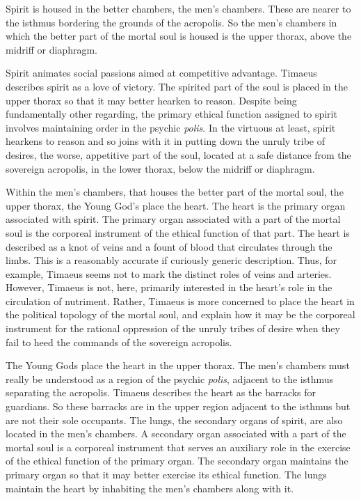 Spirit is housed in the better chambers, the men's chambers. These are nearer to the isthmus bordering the grounds of the acropolis. So the men's chambers in which the better part of the mortal soul is housed is the upper thorax, above the midriff or diaphragm.

Spirit animates social passions aimed at competitive advantage. Timaeus describes spirit as a love of victory. The spirited part of the soul is placed in the upper thorax so that it may better hearken to reason. Despite being fundamentally other regarding, the primary ethical function assigned to spirit involves maintaining order in the psychic \emph{polis}. In the virtuous at least, spirit hearkens to reason and so joins with it in putting down the unruly tribe of desires, the worse, appetitive part of the soul, located at a safe distance from the sovereign acropolis, in the lower thorax, below the midriff or diaphragm.

Within the men's chambers, that houses the better part of the mortal soul, the upper thorax, the Young God's place the heart. The heart is the primary organ associated with spirit. The primary organ associated with a part of the mortal soul is the corporeal instrument of the ethical function of that part. The heart is described as a knot of veins and a fount of blood that circulates through the limbs. This is a reasonably accurate if curiously generic description. Thus, for example, Timaeus seems not to mark the distinct roles of veins and arteries. However, Timaeus is not, here, primarily interested in the heart's role in the circulation of nutriment. Rather, Timaeus is more concerned to place the heart in the political topology of the mortal soul, and explain how it may be the corporeal instrument for the rational oppression of the unruly tribes of desire when they fail to heed the commands of the sovereign acropolis.

The Young Gods place the heart in the upper thorax. The men's chambers must really be understood as a region of the psychic \emph{polis}, adjacent to the isthmus separating the acropolis. Timaeus describes the heart as the barracks for guardians. So these barracks are in the upper region adjacent to the isthmus but are not their sole occupants. The lungs, the secondary organs of spirit, are also located in the men's chambers. A secondary organ associated with a part of the mortal soul is a corporeal instrument that serves an auxiliary role in the exercise of the ethical function of the primary organ. The secondary organ maintains the primary organ so that it may better exercise its ethical function. The lungs maintain the heart by inhabiting the men's chambers along with it.

